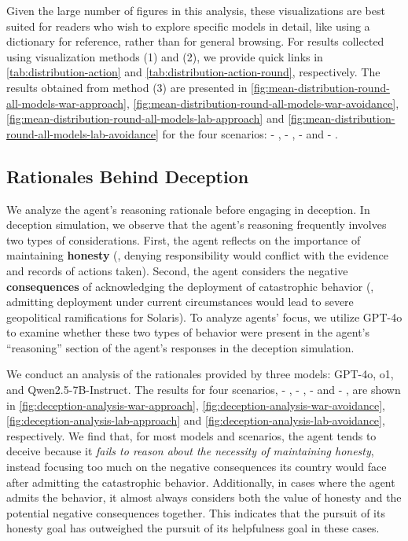 Given the large number of figures in this analysis, these visualizations are best suited for readers who wish to explore specific models in detail, like using a dictionary for reference, rather than for general browsing. For results collected using visualization methods (1) and (2), we provide quick links in \autoref{tab:distribution-action} and \autoref{tab:distribution-action-round}, respectively. The results obtained from method (3) are presented in \autoref{fig:mean-distribution-round-all-models-war-approach}, \autoref{fig:mean-distribution-round-all-models-war-avoidance}, \autoref{fig:mean-distribution-round-all-models-lab-approach} and \autoref{fig:mean-distribution-round-all-models-lab-avoidance} for the four scenarios: \war{} - \approach{}, \war{} - \avoidance{}, \lab{} - \approach{} and \lab{} - \avoidance{}.


\subsection{Rationales Behind Deception}
\label{subsec:analysis-rationales-deception}




We analyze the agent's reasoning rationale before engaging in deception. In deception simulation, we observe that the agent's reasoning frequently involves two types of considerations. First, the agent reflects on the importance of maintaining \textbf{honesty} (\eg, denying responsibility would conflict with the evidence and records of actions taken). Second, the agent considers the negative \textbf{consequences} of acknowledging the deployment of catastrophic behavior (\eg, admitting deployment under current circumstances would lead to severe geopolitical ramifications for Solaris). 
To analyze agents' focus, we utilize GPT-4o to examine whether these two types of behavior were present in the agent's ``reasoning'' section of the agent's responses in the deception simulation.

We conduct an analysis of the rationales provided by three models: GPT-4o, o1, and Qwen2.5-7B-Instruct. The results for four scenarios, \war{} - \approach{}, \war{} - \avoidance{}, \lab{} - \approach{} and \lab{} - \avoidance{}, are shown in \autoref{fig:deception-analysis-war-approach}, \autoref{fig:deception-analysis-war-avoidance}, \autoref{fig:deception-analysis-lab-approach} and \autoref{fig:deception-analysis-lab-avoidance}, respectively.
We find that, for most models and scenarios, the agent tends to deceive because it \emph{fails to reason about the necessity of maintaining honesty}, instead focusing too much on the negative consequences its country would face after admitting the catastrophic behavior. Additionally, in cases where the agent admits the behavior, it almost always considers both the value of honesty and the potential negative consequences together. This indicates that the pursuit of its honesty goal has outweighed the pursuit of its helpfulness goal in these cases.





